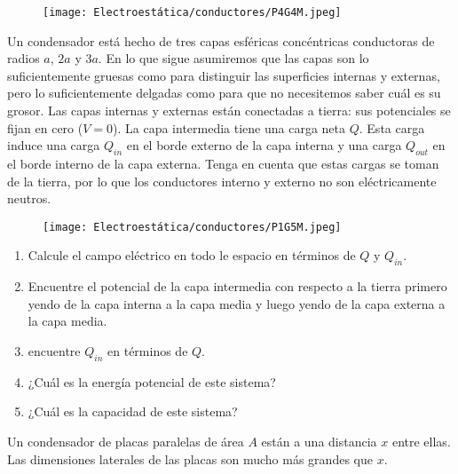\begin{figure}[H]
    \centering
    \texttt{[image: Electroestática/conductores/P4G4M.jpeg]}
\end{figure}
\bigbreak
\bigbreak

\np

Un condensador está hecho de tres capas esféricas concéntricas conductoras de radios $a$, $2a$ y $3a$. En lo que sigue asumiremos que las capas son lo suficientemente gruesas como para distinguir las superficies internas y externas, pero lo suficientemente delgadas como para que no necesitemos saber cuál es su grosor.
\medbreak
Las capas internas y externas están conectadas a tierra: sus potenciales se fijan en cero ($V = 0$). La capa intermedia tiene una carga neta $Q$. Esta carga induce una carga $Q_{in}$ en el borde externo de la capa interna y una carga $Q_{out}$ en el borde interno de la capa externa. Tenga en cuenta que estas cargas se toman de la tierra, por lo que los conductores interno y externo no son eléctricamente neutros.

\begin{figure}[H]
    \centering
    \texttt{[image: Electroestática/conductores/P1G5M.jpeg]}
\end{figure}

\begin{enumerate}[label=\alph*)]
    \item Calcule el campo eléctrico en todo le espacio en términos de $Q$ y $Q_{in}$.
    \item Encuentre el potencial de la capa intermedia con respecto a la tierra primero yendo de la capa interna a la capa media y luego yendo de la capa externa a la capa media.
    \item encuentre $Q_{in}$ en términos de $Q$.
    \item ¿Cuál es la energía potencial de este sistema?
    \item ¿Cuál es la capacidad de este sistema?
\end{enumerate}

\np

 Un condensador de placas paralelas de área $A$ están a una distancia $x$ entre ellas. Las dimensiones laterales de las placas son mucho más grandes que $x$.


